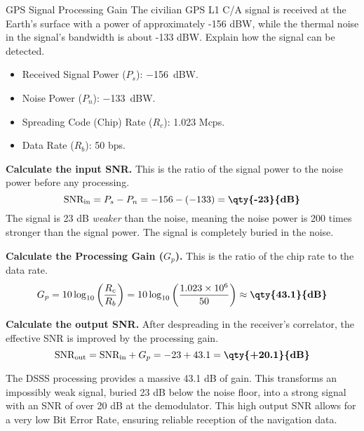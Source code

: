 \begin{workedexample}{GPS Signal Processing Gain}
     The civilian GPS L1 C/A signal is received at the Earth's surface with a power of approximately -156 dBW, while the thermal noise in the signal's bandwidth is about -133 dBW. Explain how the signal can be detected.

    \begin{itemize}
        \item Received Signal Power ($P_s$): \qty{-156}{dBW}.
        \item Noise Power ($P_n$): \qty{-133}{dBW}.
        \item Spreading Code (Chip) Rate ($R_c$): 1.023 Mcps.
        \item Data Rate ($R_b$): 50 bps.
    \end{itemize}

    \begin{derivationsteps}
        \step \textbf{Calculate the input SNR.} This is the ratio of the signal power to the noise power before any processing.
        \[ \text{SNR}_{\text{in}} = P_s - P_n = -156 - (-133) = \textbf{\qty{-23}{dB}} \]
        The signal is 23 dB \emph{weaker} than the noise, meaning the noise power is 200 times stronger than the signal power. The signal is completely buried in the noise.

        \step \textbf{Calculate the Processing Gain ($G_p$).} This is the ratio of the chip rate to the data rate.
        \[ G_p = 10\log_{10}\left(\frac{R_c}{R_b}\right) = 10\log_{10}\left(\frac{1.023 \times 10^6}{50}\right) \approx \textbf{\qty{43.1}{dB}} \]
        
        \step \textbf{Calculate the output SNR.} After despreading in the receiver's correlator, the effective SNR is improved by the processing gain.
        \[ \text{SNR}_{\text{out}} = \text{SNR}_{\text{in}} + G_p = -23 + 43.1 = \textbf{\qty{+20.1}{dB}} \]
    \end{derivationsteps}
    
     The DSSS processing provides a massive 43.1 dB of gain. This transforms an impossibly weak signal, buried 23 dB below the noise floor, into a strong signal with an SNR of over 20 dB at the demodulator. This high output SNR allows for a very low Bit Error Rate, ensuring reliable reception of the navigation data.
\end{workedexample}


